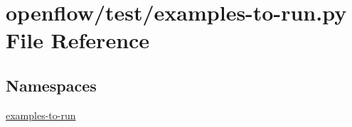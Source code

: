 \hypertarget{openflow_2test_2examples-to-run_8py}{}\section{openflow/test/examples-\/to-\/run.py File Reference}
\label{openflow_2test_2examples-to-run_8py}
\subsection*{Namespaces}
\begin{DoxyCompactItemize}
\item 
 \hyperlink{namespaceexamples-to-run}{examples-\/to-\/run}
\end{DoxyCompactItemize}
